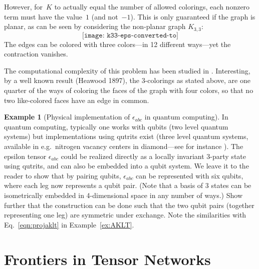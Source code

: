 \documentclass[aps,pra,12pt,nofootinbib,superscriptaddress,longbibliography]{revtex4-1}
\theoremstyle{plain}
\theoremstyle{definition}
\newtheorem{example}[theorem]{Example}
\newcommand{\ket}[1]{\mbox{$|#1\rangle$}}
\newcommand{\be}{\begin{equation}}
\newcommand{\ee}{\end{equation}}
\begin{document}
However, for~$K$ to actually equal the number of allowed colorings, each nonzero term must have the value~$1$ (and not~$-1$).
This is only guaranteed if the graph is planar,
as can be seen by considering the non-planar graph $K_{3,3}$:
\be
\texttt{[image: k33-eps-converted-to]}
\ee 
The edges can be colored with three colors---in 12 different ways---yet the contraction vanishes.



The computational complexity of this problem has been studied in \cite{xia2007computational}. Interesting, by a well known result (Heawood 1897), the 3-colorings as stated above, are one quarter of the ways of coloring the faces of the graph with four colors, so that no 
 two like-colored faces have an edge in common.  

\begin{example}[Physical implementation of $\epsilon_{abc}$ in quantum computing]
In quantum computing, typically one works with qubits (two level quantum systems) but implementations using qutrits exist (three level quantum systems, available in e.g.~nitrogen vacancy centers in diamond---see for instance \cite{2014NatCo...5E3371D}). 
The epsilon tensor $\epsilon_{abc}$ could be realized directly as a locally invariant 3-party state using qutrits, and can also be embedded into a qubit system.  We leave it to the reader to show that by pairing qubits, $\epsilon_{abc}$ can be represented with six qubits, where each leg now represents a qubit pair.  (Note that a basis of 3 states can be isometrically embedded in 4-dimensional space in any number of ways.) Show further that the construction can be done such that the two qubit pairs (together representing one leg) are symmetric under exchange.
Note the similarities with Eq.~\eqref{eqn:projaklt} in Example~\ref{ex:AKLT}.
\end{example}

 
 
\section{Frontiers in Tensor Networks} 
\end{document}
